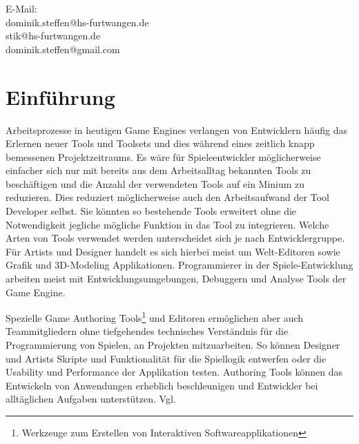 \documentclass[pagesize, paper=a4, fontsize=12pt, titlepage=true, headings=small, headnosepline, abstractoff, liststotoc, nochapterprefix, plainheadsepline, twoside]{scrreprt}
\begin{document}
E-Mail:\\
dominik.steffen@hs-furtwangen.de\\
stik@hs-furtwangen.de\\
dominik.steffen@gmail.com\\
\endgroup
\newpage
\thispagestyle{empty}
\mbox{}

\begingroup
	\clearpage
	\renewcommand*{\chapterpagestyle}{empty}
	\pagestyle{empty}
	\tableofcontents
	\clearpage
\endgroup
\newpage
\thispagestyle{empty}
\mbox{}


\renewcommand*{\chapterpagestyle}{plain}
\pagestyle{plain}
\setcounter{page}{0}

\chapter{Einführung}
Arbeitsprozesse in heutigen Game Engines verlangen von Entwicklern häufig das Erlernen neuer Tools und Toolsets und dies während eines zeitlich knapp bemessenen Projektzeitraums. Es wäre für Spieleentwickler möglicherweise einfacher sich nur mit bereits aus dem Arbeitsalltag bekannten Tools zu beschäftigen und die Anzahl der verwendeten Tools auf ein Minium zu reduzieren. Dies reduziert möglicherweise auch den Arbeitsaufwand der Tool Developer selbst. Sie könnten so bestehende Tools erweitert ohne die Notwendigkeit jegliche mögliche Funktion in das Tool zu integrieren. Welche Arten von Tools verwendet werden unterscheidet sich je nach Entwicklergruppe. Für Artists und Designer handelt es sich hierbei meist um Welt-Editoren sowie Grafik und 3D-Modeling Applikationen. Programmierer in der Spiele-Entwicklung arbeiten meist mit Entwicklungsumgebungen, Debuggern und Analyse Tools der Game Engine.

Spezielle Game Authoring Tools\footnote{Werkzeuge zum Erstellen von Interaktiven Softwareapplikationen} und Editoren ermöglichen aber auch Teammitgliedern ohne tiefgehendes technisches Verständnis für die Programmierung von Spielen, an Projekten mitzuarbeiten. So können Designer und Artists Skripte und Funktionalität für die Spiellogik entwerfen oder die Usability und Performance der Applikation testen. Authoring Tools können das Entwickeln von Anwendungen erheblich beschleunigen und Entwickler bei alltäglichen Aufgaben unterstützen. Vgl. 
\end{document}
